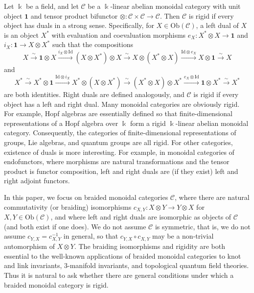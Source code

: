 \documentclass[11pt, reqno]{amsart}
\theoremstyle{definition}\newtheorem{defi}[thm]{Definition}
\theoremstyle{definition}\newtheorem{rem}[thm]{Remark}
\theoremstyle{definition}\newtheorem{exam}[thm]{Example}
\theoremstyle{definition}\newtheorem{assum}[thm]{Assumption}
\newcommand{\cC}{\mathcal{C}}
\newcommand{\Id}{\mathrm{Id}}
\newcommand{\vac}{\mathbf{1}}
\begin{document}
Let $\Bbbk$ be a field, and let $\cC$ be a $\Bbbk$-linear abelian monoidal category with unit object $\vac$ and tensor product bifunctor $\otimes: \cC\times\cC\rightarrow\cC$. Then $\cC$ is rigid if every object has duals in a strong sense. Specifically, for $X\in\mathrm{Ob}(\cC)$, a left dual of $X$ is an object $X^*$ with evaluation and coevaluation morphisms $e_X: X^*\otimes X\rightarrow\vac$ and $i_X:\vac\rightarrow X\otimes X^*$ such that the compositions
\begin{equation*}
X\xrightarrow{\sim} \vac\otimes X\xrightarrow{i_X\otimes\Id} (X\otimes X^*)\otimes X\xrightarrow{\sim} X\otimes (X^*\otimes X)\xrightarrow{\Id\otimes e_X} X\otimes\vac\xrightarrow{\sim} X
\end{equation*}
and
\begin{equation*}
X^*\xrightarrow{\sim} X^*\otimes \vac\xrightarrow{\Id\otimes i_X} X^*\otimes(X\otimes X^*)\xrightarrow{\sim} (X^*\otimes X)\otimes X^*\xrightarrow{e_X\otimes\Id} \vac\otimes X^*\xrightarrow{\sim} X^*
\end{equation*}
are both identities. Right duals are defined analogously, and $\cC$ is rigid if every object has a left and right dual. Many monoidal categories are obviously rigid. For example, Hopf algebras are essentially defined so that finite-dimensional representations of a Hopf algebra over $\Bbbk$ form a rigid $\Bbbk$-linear abelian monoidal category. Consequently, the categories of finite-dimensional representations of groups, Lie algebras, and quantum groups are all rigid. For other categories, existence of duals is more interesting. For example, in monoidal categories of endofunctors, where morphisms are natural transformations and the tensor product is functor composition, left and right duals are (if they exist) left and right adjoint functors.

In this paper, we focus on braided monoidal categories $\cC$, where there are natural commutativity (or braiding) isomorphisms $c_{X,Y}: X\otimes Y\rightarrow Y\otimes X$ for $X,Y\in\mathrm{Ob}(\cC)$, and where left and right duals are isomorphic as objects of $\cC$ (and both exist if one does). We do not assume $\cC$ is symmetric, that is, we do not assume $c_{Y,X} = c_{X,Y}^{-1}$ in general, so that $c_{Y,X}\circ c_{X,Y}$ may be a non-trivial automorphism of $X\otimes Y$. The braiding isomorphisms and rigidity are both essential to the well-known applications of braided monoidal categories to knot and link invariants, $3$-manifold invariants, and topological quantum field theories. Thus it is natural to ask whether there are general conditions under which a braided monoidal category is rigid.
\end{document}
